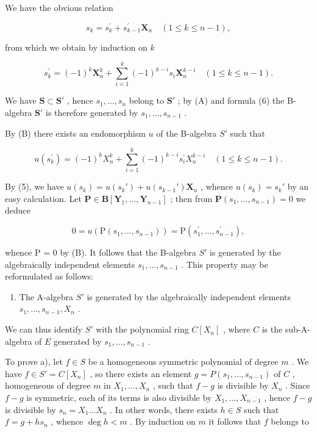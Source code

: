 We have the obvious relation

\[
s _ {k} = s _ {k} ^ {\prime} + s _ {k - 1} ^ {\prime} \mathbf {X} _ {n} \quad (1 \leqslant k \leqslant n - 1),\tag{5}
\]

from which we obtain by induction on \(k\)

\[
s _ {k} ^ {\prime} = (- 1) ^ {k} \mathbf {X} _ {n} ^ {k} + \sum_ {i = 1} ^ {k} (- 1) ^ {k - i} s _ {i} \mathbf {X} _ {n} ^ {k - i} \quad (1 \leqslant k \leqslant n - 1).\tag{6}
\]

We have \(\mathbf{S} \subset \mathbf{S}'\) , hence \(s_1, \ldots, s_n\) belong to \(\mathbf{S}'\) ; by (A) and formula (6) the B-algebra \(\mathbf{S}'\) is therefore generated by \(s_1, \ldots, s_{n-1}\) .

By (B) there exists an endomorphism \(u\) of the B-algebra \(S'\) such that

\[
u \left(s _ {k} ^ {\prime}\right) = (- 1) ^ {k} X _ {n} ^ {k} + \sum_ {i = 1} ^ {k} (- 1) ^ {k - i} s _ {i} ^ {\prime} X _ {n} ^ {k - i} \quad (1 \leqslant k \leqslant n - 1).\tag{7}
\]

By (5), we have \(u(s_k) = u(s_k') + u(s_{k-1}') \mathbf{X}_n\) , whence \(u(s_k) = s_k'\) by an easy calculation. Let \(\mathbf{P} \in \mathbf{B}[\mathbf{Y}_1, \ldots, \mathbf{Y}_{n-1}]\) ; then from \(\mathbf{P}(s_1, \ldots, s_{n-1}) = 0\) we deduce

\[
0 = u \left(\mathrm{P} \left(s _ {1}, \dots , s _ {n - 1}\right)\right) = \mathrm{P} \left(s _ {1} ^ {\prime}, \dots , s _ {n - 1} ^ {\prime}\right),
\]

whence P = 0 by (B). It follows that the B-algebra \(S'\) is generated by the algebraically independent elements \(s_{1}, \ldots, s_{n-1}\) . This property may be reformulated as follows:

\begin{enumerate}
\def\labelenumi{(\Alph{enumi})}
\setcounter{enumi}{3}
\tightlist
\item
  The A-algebra \(S'\) is generated by the algebraically independent elements \(s_1, \ldots, s_{n-1}, X_n\) .
\end{enumerate}

We can thus identify \(S'\) with the polynomial ring \(C[X_n]\) , where \(C\) is the sub-A-algebra of \(E\) generated by \(s_1, \ldots, s_{n-1}\) .

To prove a), let \(f \in S\) be a homogeneous symmetric polynomial of degree \(m\) . We have \(f \in S' = C[X_n]\) , so there exists an element \(g = P(s_1, \ldots, s_{n-1})\) of \(C\) , homogeneous of degree \(m\) in \(X_1, \ldots, X_n\) , such that \(f - g\) is divisible by \(X_n\) . Since \(f - g\) is symmetric, each of its terms is also divisible by \(X_1, \ldots, X_{n-1}\) , hence \(f - g\) is divisible by \(s_n = X_1 \ldots X_n\) . In other words, there exists \(h \in S\) such that \(f = g + hs_n\) , whence \(\deg h < m\) . By induction on \(m\) it follows that \(f\) belongs to


